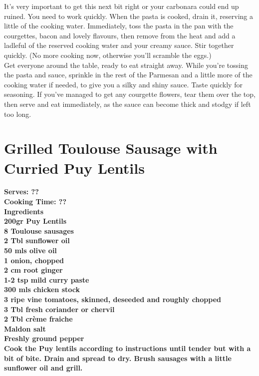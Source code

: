 \documentclass[18pt, oneside]{book}
\begin{document}
It’s very important to get this next bit right or your carbonara could end up ruined. You need to work quickly. When the pasta is cooked, drain it, reserving a little of the cooking water. Immediately, toss the pasta in the pan with the courgettes, bacon and lovely flavours, then remove from the heat and add a ladleful of the reserved cooking water and your creamy sauce. Stir together quickly. (No more cooking now, otherwise you’ll scramble the eggs.) \\

Get everyone around the table, ready to eat straight away. While you’re tossing the pasta and sauce, sprinkle in the rest of the Parmesan and a little more of the cooking water if needed, to give you a silky and shiny sauce. Taste quickly for seasoning. If you’ve managed to get any courgette flowers, tear them over the top, then serve and eat immediately, as the sauce can become thick and stodgy if left too long.







\section{Grilled Toulouse Sausage with Curried Puy Lentils}

\bf{Serves: ??} \\
\bf{Cooking Time: ??} \\

\bf{Ingredients} \normalfont \\
200gr Puy Lentils \\ 
8 Toulouse sausages \\
2 Tbl sunflower oil \\
50 mls olive oil \\
1 onion, chopped \\
2 cm root ginger \\
1-2 tsp mild curry paste \\
300 mls chicken stock \\
3 ripe vine tomatoes, skinned, deseeded and roughly chopped \\
3 Tbl fresh coriander or chervil \\
2 Tbl crème fraiche \\
Maldon salt \\
Freshly ground pepper \\

Cook the Puy lentils according to instructions until tender but with a bit of bite. Drain and spread to dry.
Brush sausages with a little sunflower oil and grill. \\
\end{document}
